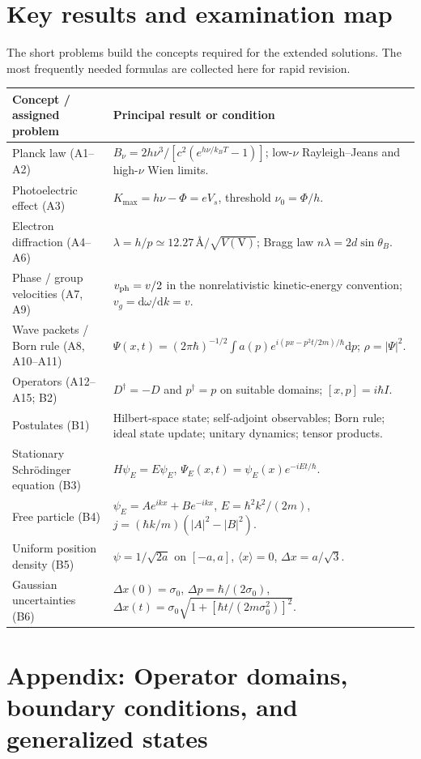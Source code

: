 \documentclass[11pt,a4paper]{article}
\newcommand{\dd}{\mathrm{d}}
\begin{document}
\section{Key results and examination map}
The short problems build the concepts required for the extended solutions. The most frequently needed formulas are collected here for rapid revision.
\begin{longtable}{@{}p{}p{}@{}}
\toprule
\textbf{Concept / assigned problem} & \textbf{Principal result or condition} \\
\midrule
\endhead
Planck law (A1--A2) & $B_\nu=2h\nu^3/[c^2(e^{h\nu/k_BT}-1)]$; low-$\nu$ Rayleigh--Jeans and high-$\nu$ Wien limits.\\
Photoelectric effect (A3) & $K_{\max}=h\nu-\Phi=eV_s$, threshold $\nu_0=\Phi/h$.\\
Electron diffraction (A4--A6) & $\lambda=h/p\simeq 12.27\,\text{\AA}/\sqrt{V(\mathrm V)}$; Bragg law $n\lambda=2d\sin\theta_B$.\\
Phase / group velocities (A7, A9) & $v_{\rm ph}=v/2$ in the nonrelativistic kinetic-energy convention; $v_g=\dd\omega/\dd k=v$.\\
Wave packets / Born rule (A8, A10--A11) & $\Psi(x,t)=(2\pi\hbar)^{-1/2}\int a(p)e^{i(px-p^2t/2m)/\hbar}\dd p$; $\rho=|\Psi|^2$.\\
Operators (A12--A15; B2) & $D^\dagger=-D$ and $p^\dagger=p$ on suitable domains; $[x,p]=i\hbar I$.\\
Postulates (B1) & Hilbert-space state; self-adjoint observables; Born rule; ideal state update; unitary dynamics; tensor products.\\
Stationary Schr\"odinger equation (B3) & $H\psi_E=E\psi_E$, $\Psi_E(x,t)=\psi_E(x)e^{-iEt/\hbar}$.\\
Free particle (B4) & $\psi_E=Ae^{ikx}+Be^{-ikx}$, $E=\hbar^2k^2/(2m)$, $j=(\hbar k/m)(|A|^2-|B|^2)$.\\
Uniform position density (B5) & $\psi=1/\sqrt{2a}$ on $[-a,a]$, $\langle x\rangle=0$, $\Delta x=a/\sqrt3$.\\
Gaussian uncertainties (B6) & $\Delta x(0)=\sigma_0$, $\Delta p=\hbar/(2\sigma_0)$, $\Delta x(t)=\sigma_0\sqrt{1+[\hbar t/(2m\sigma_0^2)]^2}$.\\
\bottomrule
\end{longtable}

\appendix
\section{Appendix: Operator domains, boundary conditions, and generalized states}
\end{document}
